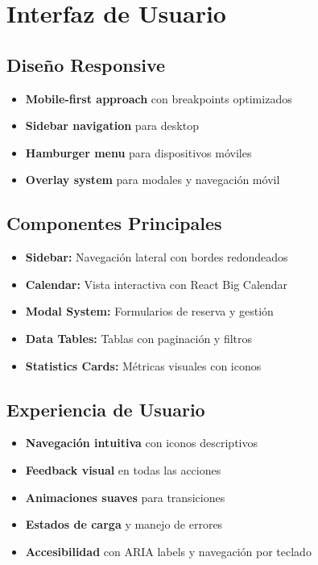 \documentclass[12pt,a4paper]{article}
\begin{document}
\section{Interfaz de Usuario}

\subsection{Diseño Responsive}
\begin{itemize}
    \item \textbf{Mobile-first approach} con breakpoints optimizados
    \item \textbf{Sidebar navigation} para desktop
    \item \textbf{Hamburger menu} para dispositivos móviles
    \item \textbf{Overlay system} para modales y navegación móvil
\end{itemize}

\subsection{Componentes Principales}
\begin{itemize}
    \item \textbf{Sidebar:} Navegación lateral con bordes redondeados
    \item \textbf{Calendar:} Vista interactiva con React Big Calendar
    \item \textbf{Modal System:} Formularios de reserva y gestión
    \item \textbf{Data Tables:} Tablas con paginación y filtros
    \item \textbf{Statistics Cards:} Métricas visuales con iconos
\end{itemize}

\subsection{Experiencia de Usuario}
\begin{itemize}
    \item \textbf{Navegación intuitiva} con iconos descriptivos
    \item \textbf{Feedback visual} en todas las acciones
    \item \textbf{Animaciones suaves} para transiciones
    \item \textbf{Estados de carga} y manejo de errores
    \item \textbf{Accesibilidad} con ARIA labels y navegación por teclado
\end{itemize}
\end{document}
